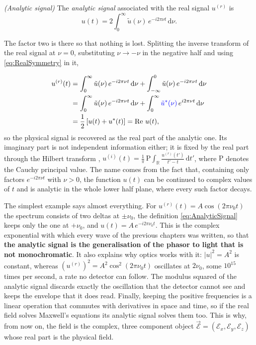 		\begin{myDef}
			\textit{(Analytic signal)} The \emph{analytic signal} associated with the real
			signal $u^{(r)}$ is
			\begin{equation}\label{eq:AnalyticSignal}
				u(t) = 2\int_{0}^{\infty}\tilde{u}(\nu)\,e^{-i2\pi\nu t}\,\mathrm{d}\nu .
			\end{equation}
		\end{myDef}

		The factor two is there so that nothing is lost. Splitting the inverse transform of the
		real signal at $\nu=0$, substituting $\nu\to-\nu$ in the negative half and using
		\eqref{eq:RealSymmetry} in it,

		\begin{align}
			u^{(r)}(t) &= \int_{0}^{\infty}\tilde{u}(\nu)\,e^{-i2\pi\nu t}\,\mathrm{d}\nu + \int_{-\infty}^{0}\tilde{u}(\nu)\,e^{-i2\pi\nu t}\,\mathrm{d}\nu \nonumber\\
			&= \int_{0}^{\infty}\tilde{u}(\nu)\,e^{-i2\pi\nu t}\,\mathrm{d}\nu + \int_{0}^{\infty}\textcolor{blue}{\tilde{u}^{*}(\nu)}\,e^{i2\pi\nu t}\,\mathrm{d}\nu \nonumber\\
			&= \frac{1}{2}\left[u(t) + u^{*}(t)\right] = \operatorname{Re}\,u(t),
		\end{align}
		so the physical signal is recovered as the real part of the analytic one. Its imaginary
		part is not independent information either; it is fixed by the real part through the
		Hilbert transform \citep{mandel1995optical},
		$u^{(i)}(t) = \frac{1}{\pi}\,\mathrm{P}\!\int_{\mathbb{R}}\frac{u^{(r)}(t')}{t'-t}\,\mathrm{d}t'$,
		where $\mathrm{P}$ denotes the Cauchy principal value. The name comes from the fact that,
		containing only factors $e^{-i2\pi\nu t}$ with $\nu>0$, the function $u(t)$ can be
		continued to complex values of $t$ and is analytic in the whole lower half plane, where
		every such factor decays.

		The simplest example says almost everything. For $u^{(r)}(t) = A\cos(2\pi\nu_{0}t)$ the
		spectrum consists of two deltas at $\pm\nu_{0}$, the definition \eqref{eq:AnalyticSignal}
		keeps only the one at $+\nu_{0}$, and $u(t) = A\,e^{-i2\pi\nu_{0}t}$. This is the complex
		exponential with which every wave of the previous chapters was written, so that
		\textbf{the analytic signal is the generalisation of the phasor to light that is not
		monochromatic}. It also explains why optics works with it: $|u|^{2}=A^{2}$ is constant,
		whereas $(u^{(r)})^{2}=A^{2}\cos^{2}(2\pi\nu_{0}t)$ oscillates at $2\nu_{0}$, some
		$10^{15}$ times per second, a rate no detector can follow. The modulus squared of the
		analytic signal discards exactly the oscillation that the detector cannot see and keeps
		the envelope that it does read. Finally, keeping the positive frequencies is a linear
		operation that commutes with derivatives in space and time, so if the real field solves
		Maxwell's equations its analytic signal solves them too. This is why, from now on, the
		field is the complex, three component object
		$\vec{\mathcal{E}} = (\mathcal{E}_{x},\mathcal{E}_{y},\mathcal{E}_{z})$ whose real part is
		the physical field.

